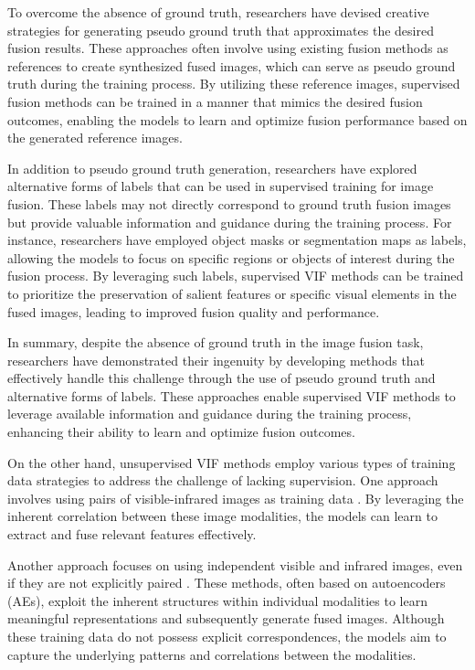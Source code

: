 To overcome the absence of ground truth, researchers have devised creative strategies for generating pseudo ground truth that approximates the desired fusion results. These approaches often involve using existing fusion methods as references to create synthesized fused images, which can serve as pseudo ground truth during the training process. By utilizing these reference images, supervised fusion methods can be trained in a manner that mimics the desired fusion outcomes, enabling the models to learn and optimize fusion performance based on the generated reference images.

In addition to pseudo ground truth generation, researchers have explored alternative forms of labels that can be used in supervised training for image fusion. These labels may not directly correspond to ground truth fusion images but provide valuable information and guidance during the training process. For instance, researchers have employed object masks or segmentation maps as labels, allowing the models to focus on specific regions or objects of interest during the fusion process. By leveraging such labels, supervised VIF methods can be trained to prioritize the preservation of salient features or specific visual elements in the fused images, leading to improved fusion quality and performance.

In summary, despite the absence of ground truth in the image fusion task, researchers have demonstrated their ingenuity by developing methods that effectively handle this challenge through the use of pseudo ground truth and alternative forms of labels. These approaches enable supervised VIF methods to leverage available information and guidance during the training process, enhancing their ability to learn and optimize fusion outcomes.

On the other hand, unsupervised VIF methods employ various types of training data strategies to address the challenge of lacking supervision. One approach involves using pairs of visible-infrared images as training data \cite{rao2023tgfuse, xu2021classification, song2022triple}. By leveraging the inherent correlation between these image modalities, the models can learn to extract and fuse relevant features effectively.

Another approach focuses on using independent visible and infrared images, even if they are not explicitly paired \cite{jian2020sedrfuse, patel2020approach, fu2021dual, zhao2021efficient}. These methods, often based on autoencoders (AEs), exploit the inherent structures within individual modalities to learn meaningful representations and subsequently generate fused images. Although these training data do not possess explicit correspondences, the models aim to capture the underlying patterns and correlations between the modalities.

